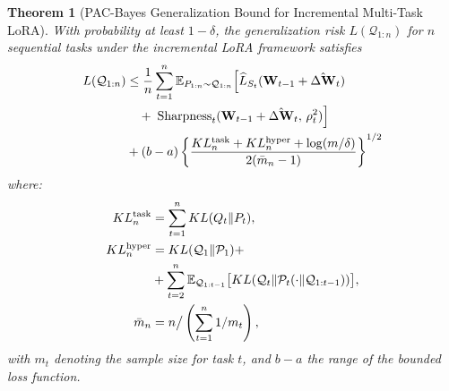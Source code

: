 \documentclass[letterpaper]{article} %
\newtheorem{theorem}{Theorem}
\begin{document}
\begin{theorem}[PAC-Bayes Generalization Bound for Incremental Multi-Task LoRA]
With probability at least $1-\delta$, the generalization risk $L(\mathcal{Q}_{1:n})$ for $n$ sequential tasks under the incremental LoRA framework satisfies
\begin{align}
L(\mathcal{Q}_{1:n}) &\leq \frac{1}{n} \sum_{t=1}^n 
    \mathbb{E}_{P_{1:n} \sim \mathcal{Q}_{1:n}}
    \Big[
        \widehat{L}_{S_t}(\mathbf{W}_{t-1} + \hat{\Delta\mathbf{W}}_t)
    \notag \\
&\quad +\; \mathrm{Sharpness}_t(\mathbf{W}_{t-1} + \hat{\Delta\mathbf{W}}_t,\, \rho_t^2)
    \Big] 
    \notag \\
& + (b-a) \left\{ 
    \frac{KL_n^{\text{task}} + KL_n^{\text{hyper}} + \log(m/\delta)}
         {2(\bar{m}_n - 1)}
\right\}^{1/2}
\label{eq:lora-pac-bayes-bound}
\end{align}
where:
\begin{align}
KL_n^{\mathrm{task}} &= \sum_{t=1}^n KL(Q_t\|P_t), \notag  \\
KL_n^{\mathrm{hyper}} &= KL(\mathcal{Q}_1 \| \mathcal{P}_1) +  \\ &+\sum_{t=2}^n \mathbb{E}_{\mathcal{Q}_{1:t-1}}\big[KL(\mathcal{Q}_t \| \mathcal{P}_t(\cdot \| \mathcal{Q}_{1:t-1}))\big], \notag\\
\bar{m}_n &= n \big/ \left(\sum_{t=1}^n 1/m_t\right), \notag
\end{align}
with $m_t$ denoting the sample size for task $t$, and $b-a$ the range of the bounded loss function.
\end{theorem}
\end{document}
